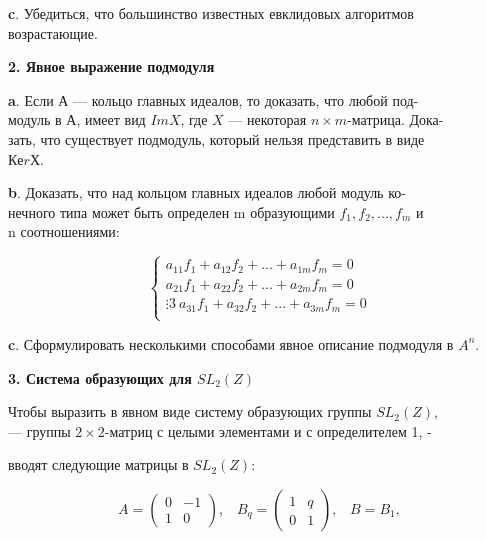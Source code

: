 \documentclass{../template/mai_book}
\begin{document}
\medskip

{\bf c}. Убедиться, что большинство известных евклидовых алгоритмов\\ 
возрастающие. 

\medskip

{\noindent \bf 2. Явное выражение подмодуля} 

\medskip

{\bf a}. Если $А$ — кольцо главных идеалов, то доказать, что любой 
под-\\модуль в $А$, имеет вид $ImX$, где $X$ — некоторая $n \times m$-матрица. 
Дока-\\зать, что существует подмодуль, который нельзя представить в виде\\ 
$КеrХ$. 

\medskip

{\bf b}. Доказать, что над кольцом главных идеалов любой модуль 
ко-\\нечного типа может быть определен m образующими $f_1,f_2,...,f_m$ и\\ 
n соотношениями: 

\begin{equation}
\left\{\begin{gathered}
a_{11}f_1 + a_{12}f_2 + ... + a_{1m}f_m = 0\\
a_{21}f_1 + a_{22}f_2 + ... + a_{2m}f_m = 0\\
\vdots3\
a_{31}f_1 + a_{32}f_2 + ... + a_{3m}f_m = 0\\
\end{gathered}\right.
\end{equation}

\medskip

{\bf c}. Сформулировать несколькими способами явное описание 
подмодуля в $A^n$. 

\medskip

{\noindent \bf 3. Система образующих для $SL_2(Z)$} 

\medskip

Чтобы выразить в явном виде систему образующих группы $SL_2(Z)$,\\
— группы $2 \times 2$-матриц с целыми элементами и с определителем 1, -

\pagebreak


вводят следующие матрицы в $SL_2(\mathit{Z})$: 

$$A = \begin{pmatrix}
0 & -1\\ 1 & 0
\end{pmatrix},\;\;\;
B_q = \begin{pmatrix}
1 & q\\ 0 & 1
\end{pmatrix}, \;\;\; B=B_1,
$$
\end{document}
